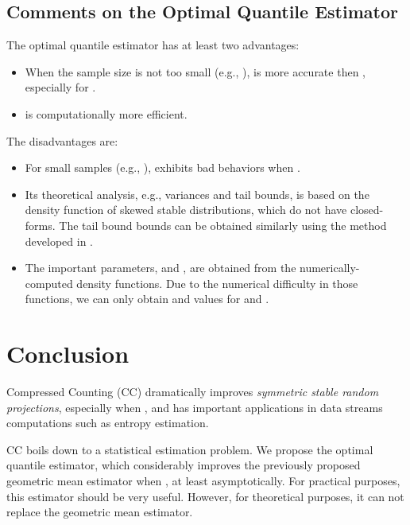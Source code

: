 \documentclass[oneside,10pt]{article}
\begin{document}
\subsection{Comments on the Optimal Quantile Estimator}

The optimal quantile estimator has at least two advantages:
\begin{itemize}
\item When the sample size  is not too small (e.g., ),  is more accurate then , especially for .
\item  is computationally more efficient.
\end{itemize}

The disadvantages are:
\begin{itemize}
\item For small samples (e.g., ),  exhibits bad behaviors when .
\item Its theoretical analysis, e.g., variances and tail bounds, is based on the density function of skewed stable distributions, which do not have closed-forms. The tail bound bounds can be obtained similarly using the method developed in \cite{Article:Li_arXiv_sym_oq}.
\item The important parameters,  and , are obtained from the numerically-computed density functions. Due to the numerical difficulty in those functions, we can only obtain  and  values for  and .
\end{itemize}

\section{Conclusion}

Compressed Counting (CC) dramatically improves {\em symmetric stable random projections}, especially when , and has important applications in data streams computations such as entropy estimation.

CC boils down to a statistical estimation problem. We propose the optimal quantile estimator, which considerably improves the previously proposed geometric mean estimator when , at least asymptotically. For practical purposes, this estimator should be very useful. However, for theoretical purposes,  it can not replace the geometric mean estimator.
\end{document}
